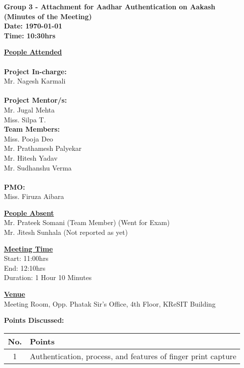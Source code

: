 \documentclass[a4paper,12pt]{article}
\begin{document}
\LARGE
\begin{center}
\textbf
{
Group 3 - Attachment for Aadhar Authentication on Aakash\\
(Minutes of the Meeting) \\ 
Date: \today \\
Time: 10:30hrs
}
\end{center}

\vfill

\large

\underline{\textbf{People Attended}} \\ 
\\
\indent \textbf{Project In-charge:} \\
\indent Mr. Nagesh Karmali \\
\\
\indent \textbf{Project Mentor/s:} \\
\indent Mr. Jugal Mehta \\
\indent Miss. Silpa T.
\\
\indent \textbf{Team Members:} \\
\indent Miss. Pooja Deo \\
\indent Mr. Prathamesh Palyekar \\
\indent Mr. Hitesh Yadav \\
\indent Mr. Sudhanshu Verma \\
\\
\indent \textbf{PMO:} \\
\indent Miss. Firuza Aibara\\

\vfill

\underline{\textbf{People Absent}} \\ 
\indent Mr. Prateek Somani (Team Member) (Went for Exam) \\
\indent Mr. Jitesh Sunhala (Not reported as yet)
\vfill

\underline{\textbf{Meeting Time}} \\
\indent Start: 11:00hrs \\
\indent End: 12:10hrs \\
\indent Duration: 1 Hour 10 Minutes \\

\vfill

\underline{\textbf{Venue}} \\
\indent Meeting Room, Opp. Phatak Sir's Office, 4th Floor, KReSIT Building

\pagebreak

\textbf{Points Discussed:}
\vskip10pt
\begin{tabular}{|c|p{13cm}|}
 \hline
 \textbf{No.} & \textbf{Points} \\
  \hline
  \hline
1 & Authentication, process, and features of finger print capture \\
  \hline
\end{tabular}
\end{document}
